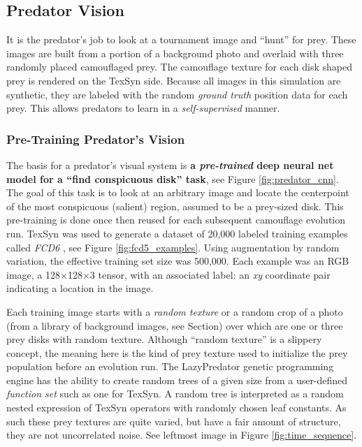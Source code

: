 \documentclass[letterpaper]{article}
\newcommand{\jargon}[1]{\textit{#1}}
\newcommand{\texsyn}[0]{TexSyn}
\newcommand{\lazypredator}[0]{LazyPredator}
\begin{document}

\subsection{Predator Vision}
\label{subsec:predator_vision}
It is the predator's job to look at a tournament image and ``hunt'' for prey. These images are built from a portion of a background photo and overlaid with three randomly placed camouflaged prey. The camouflage texture for each disk shaped prey is rendered on the \texsyn{} side. Because all images in this simulation are synthetic, they are labeled with the random \jargon{ground truth} position data for each prey. This allows predators to learn in a \jargon{self-supervised} manner.
\par


\subsubsection{Pre-Training Predator's Vision}
\label{sec:pre_train_predator}
The basis for a predator's visual system is \textbf{a \jargon{pre-trained} deep neural net model for a ``find conspicuous disk'' task}, see Figure \ref{fig:predator_cnn}. The goal of this task is to look at an arbitrary image and locate the centerpoint of the most conspicuous (salient) region, assumed to be a prey-sized disk. This pre-training is done once then reused for each subsequent camouflage evolution run. \texsyn{} was used to generate a dataset of 20,000 labeled training examples called \jargon{FCD6} \citep{reynolds_FCD6_2022}, see Figure \ref{fig:fcd5_examples}. Using augmentation by random variation, the effective training set size was 500,000. Each example was an RGB image, a 128$\times$128$\times$3 tensor, with an associated label: an \textit{xy} coordinate pair indicating a location in the image.
\par
Each training image starts with a \jargon{random texture} or a random crop of a photo (from a library of background images, see Section) over which are one or three prey disks with random texture. Although ``random texture'' is a slippery concept, the meaning here is the kind of prey texture used to initialize the prey population before an evolution run. The \lazypredator{} genetic programming engine has the ability to create random trees of a given size from a user-defined \jargon{function set} such as one for \texsyn{}. A random tree is interpreted as a random nested expression of \texsyn{} operators with randomly chosen leaf constants. As such these prey textures are quite varied, but have a fair amount of structure, they are not uncorrelated noise. See leftmost image in Figure \ref{fig:time_sequence}.
\par
\end{document}
